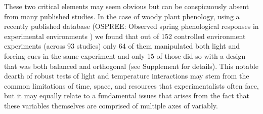 \documentclass[11pt]{article}
\begin{document}
These two critical elements may seem obvious but can be conspicuously absent from many published studies. In the case of woody plant phenology, using a recently published database (OSPREE: Observed spring phenological responses in experimental environments \citep{wolkovich2019}) we found that out of 152 controlled environment experiments (across 93 studies) only 64 of them manipulated both light and forcing cues in the same experiment and only 15 of those did so with a design that was both balanced and orthogonal (see Supplement for details). This notable dearth of robust tests of light and temperature interactions may stem from the common limitations of time, space, and resources that experimentalists often face, but it may equally relate to a fundamental issues that arises from the fact that these variables themselves are comprised of multiple axes of variably.\\
\end{document}
